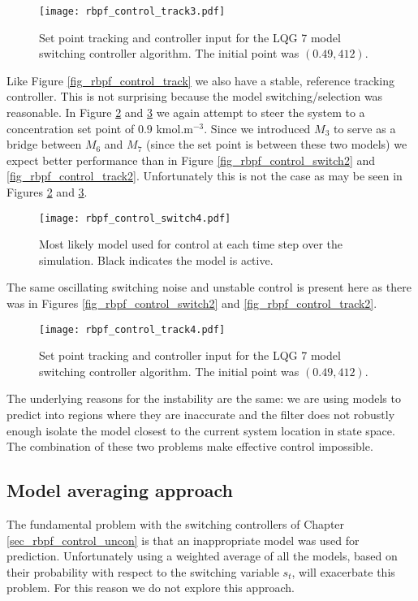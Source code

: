 \begin{figure}[H] 
\centering
\texttt{[image: rbpf\_control\_track3.pdf]}
\caption{Set point tracking and controller input for the LQG 7 model switching controller algorithm. The initial point was $(0.49, 412)$.}
\label{fig_rbpf_control_track3}
\end{figure}
Like Figure \ref{fig_rbpf_control_track} we also have a stable, reference tracking controller. This is not surprising because the model switching/selection was reasonable. In Figure \ref{fig_rbpf_control_switch4} and \ref{fig_rbpf_control_track4} we again attempt to steer the system to a concentration set point of $0.9$ kmol.m$^{-3}$. Since we introduced $M_3$ to serve as a bridge between $M_6$ and $M_7$ (since the set point is between these two models) we expect better performance than in Figure \ref{fig_rbpf_control_switch2} and \ref{fig_rbpf_control_track2}. Unfortunately this is not the case as may be seen in Figures \ref{fig_rbpf_control_switch4} and \ref{fig_rbpf_control_track4}.
\begin{figure}[H] 
\centering
\texttt{[image: rbpf\_control\_switch4.pdf]}
\caption{Most likely model used for control at each time step over the simulation. Black indicates the model is active.}
\label{fig_rbpf_control_switch4}
\end{figure}
The same oscillating switching noise and unstable control is present here as there was in Figures \ref{fig_rbpf_control_switch2} and \ref{fig_rbpf_control_track2}.
\begin{figure}[H] 
\centering
\texttt{[image: rbpf\_control\_track4.pdf]}
\caption{Set point tracking and controller input for the LQG 7 model switching controller algorithm. The initial point was $(0.49, 412)$.}
\label{fig_rbpf_control_track4}
\end{figure}
The underlying reasons for the instability are the same: we are using models to predict into regions where they are inaccurate and the filter does not robustly enough isolate the model closest to the current system location in state space. The combination of these two problems make effective control impossible.

\subsection{Model averaging approach}
\label{sec_ma_rbpf}
The fundamental problem with the switching controllers of Chapter \ref{sec_rbpf_control_uncon} is that an inappropriate model was used for prediction. Unfortunately using a weighted average of all the models, based on their probability with respect to the switching variable $s_t$, will exacerbate this problem. For this reason we do not explore this approach.

